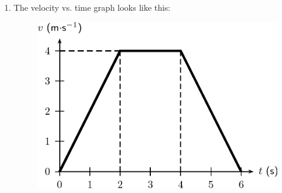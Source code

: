 {\begin{mdframed}[linewidth=4, leftmargin=40, rightmargin=40]
\begin{exercise}
\begin{enumerate}[noitemsep, label=\textbf{Step} \textbf{\arabic*}. ]
{\begin{minipage}{\columnwidth}
    \parbox[t]{\mymathboxwidth}{\large\begin{math}
    {\mathrm{Area}}_{\square }=\ell \ensuremath{\times}b=2\phantom{\rule{3.33333pt}{0ex}}\mathrm{s}\phantom{\rule{4pt}{0ex}}\ensuremath{\times}-2\phantom{\rule{0.166667em}{0ex}}\mathrm{m}\ensuremath{\cdot}{\mathrm{s}}^{-2}\phantom{\rule{4pt}{0ex}}=-4\phantom{\rule{4pt}{0ex}}\phantom{\rule{0.166667em}{0ex}}\mathrm{m}\ensuremath{\cdot}{\mathrm{s}}^{-1}\end{math}}\hfill
    \parbox[t]{48pt}{\raggedleft 
    (20.43)}
    \end{minipage}\vspace{12pt}\par
    }%
    
The acceleration had a negative value, which means that the velocity is decreasing. It starts at a velocity of 4~m\begin{math}\ensuremath{\cdot}\end{math}s\begin{math}{}^{-1}\end{math}~and decreases to 0~m\begin{math}\ensuremath{\cdot}\end{math}s\begin{math}{}^{-1}\end{math}.
\par 
      \item  
      \label{m38795*id75549}The velocity vs. time graph looks like this:




    \setcounter{subfigure}{0}


	\begin{figure}[H] %
    \begin{center}
    \label{m38795*id75564!!!underscore!!!media}\label{m38795*id75564!!!underscore!!!printimage}\includegraphics{col11305.imgs/m38795_PG10C2_044.png} %
        

\end{center}
\end{figure}
\end{enumerate}
\end{exercise}
\end{mdframed}}
